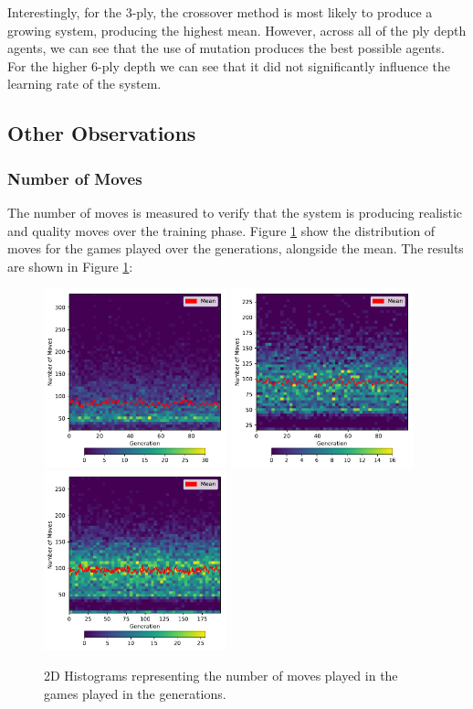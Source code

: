 \documentclass[12pt,a4paper]{article}
\begin{document}
        Interestingly, for the 3-ply, the crossover method is most likely to produce a growing system, producing the highest mean. However, across all of the ply depth agents, we can see that the use of mutation produces the best possible agents. For the higher 6-ply depth we can see that it did not significantly influence the learning rate of the system.

    \subsection{Other Observations}
        \subsubsection{Number of Moves}
            The number of moves is measured to verify that the system is producing realistic and quality moves over the training phase. Figure \ref{move_chart} show the distribution of moves for the games played over the generations, alongside the mean. The results are shown in Figure \ref{move_chart}:

            \begin{figure}[!ht]
                \centering
                \includegraphics[width=53mm]{images/results/1ply/moves.pdf}
                \includegraphics[width=53mm]{images/results/3ply/moves.pdf}
                \includegraphics[width=53mm]{images/results/6ply/moves.pdf}
                \caption{2D Histograms representing the number of moves played in the games played in the generations. \label{move_chart}}
            \end{figure}
\end{document}
